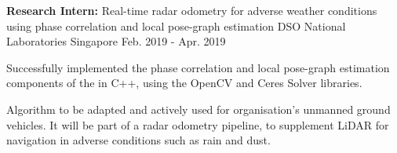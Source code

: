 


\begin{cventries}


\label{radarOdometry}

\cventry
{
	\textbf{Research Intern:} Real-time radar odometry for adverse weather conditions using phase correlation and local pose-graph estimation
} %
{DSO National Laboratories} %
{Singapore} %
{Feb. 2019 - Apr. 2019} %
{ %
	\begin{cvitems}
		\item { Successfully implemented the phase correlation and local pose-graph estimation components of the  in C++, using the OpenCV and Ceres Solver libraries.}
		\item { Algorithm to be adapted and actively used for organisation's unmanned ground vehicles. It will be part of a radar odometry pipeline, to supplement LiDAR for navigation in adverse conditions such as rain and dust. }
	\end{cvitems}
}


\label{computerVisionProjectCMU}


\end{cventries}
